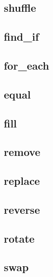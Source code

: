 \documentclass[11pt,a4paper]{article}
\begin{document}
\subsection{shuffle}
\subsection{find\_if}
\subsection{for\_each}
\subsection{equal}
\subsection{fill}
\subsection{remove}
\subsection{replace}
\subsection{reverse}
\subsection{rotate}
\subsection{swap}
\end{document}
